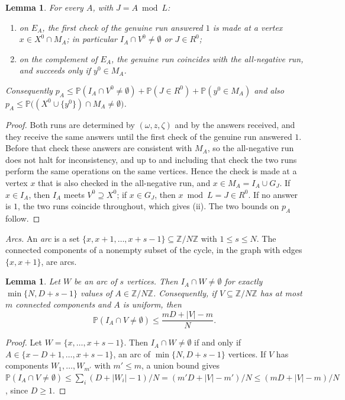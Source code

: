 \documentclass{amsart}
\theoremstyle{plain}
\newtheorem{lemma}[theorem]{Lemma}
\theoremstyle{definition}
\theoremstyle{remark}
\newcommand{\Z}{\mathbb{Z}}
\renewcommand{\Pr}{\mathbb{P}}
\begin{document}
\begin{lemma}\label{lem:coupling}
For every $A$, with $J=A\bmod L$:
\begin{enumerate}
\item[\textup{(i)}] on $E_A$, the first check of the genuine run answered $1$ is made at a vertex $x\in X^0\cap M_A$; in particular $I_A\cap V^0\neq\emptyset$ or $J\in R^0$;
\item[\textup{(ii)}] on the complement of $E_A$, the genuine run coincides with the all-negative run, and succeeds only if $y^0\in M_A$.
\end{enumerate}
Consequently $p_A\le \Pr(I_A\cap V^0\neq\emptyset)+\Pr(J\in R^0)+\Pr(y^0\in M_A)$ and also $p_A\le\Pr\bigl((X^0\cup\{y^0\})\cap M_A\neq\emptyset\bigr)$.
\end{lemma}

\begin{proof}
Both runs are determined by $(\omega,z,\zeta)$ and by the answers received, and they receive the same answers until the first check of the genuine run answered $1$. Before that check these answers are consistent with $M_A$, so the all-negative run does not halt for inconsistency, and up to and including that check the two runs perform the same operations on the same vertices. Hence the check is made at a vertex $x$ that is also checked in the all-negative run, and $x\in M_A=I_A\cup G_J$. If $x\in I_A$, then $I_A$ meets $V^0\supseteq X^0$; if $x\in G_J$, then $x\bmod L=J\in R^0$. If no answer is $1$, the two runs coincide throughout, which gives (ii). The two bounds on $p_A$ follow.
\end{proof}

\emph{Arcs.}
An \emph{arc} is a set $\{x,x+1,\dots,x+s-1\}\subseteq\Z/N\Z$ with $1\le s\le N$. The connected components of a nonempty subset of the cycle, in the graph with edges $\{x,x+1\}$, are arcs.

\begin{lemma}\label{lem:arcs}
Let $W$ be an arc of $s$ vertices. Then $I_A\cap W\neq\emptyset$ for exactly $\min\{N,D+s-1\}$ values of $A\in\Z/N\Z$. Consequently, if $V\subseteq\Z/N\Z$ has at most $m$ connected components and $A$ is uniform, then
\[
\Pr(I_A\cap V\neq\emptyset)\le\frac{mD+|V|-m}{N}.
\]
\end{lemma}

\begin{proof}
Let $W=\{x,\dots,x+s-1\}$. Then $I_A\cap W\neq\emptyset$ if and only if $A\in\{x-D+1,\dots,x+s-1\}$, an arc of $\min\{N,D+s-1\}$ vertices. If $V$ has components $W_1,\dots,W_{m'}$ with $m'\le m$, a union bound gives $\Pr(I_A\cap V\neq\emptyset)\le\sum_i(D+|W_i|-1)/N=(m'D+|V|-m')/N\le(mD+|V|-m)/N$, since $D\ge 1$.
\end{proof}
\end{document}
